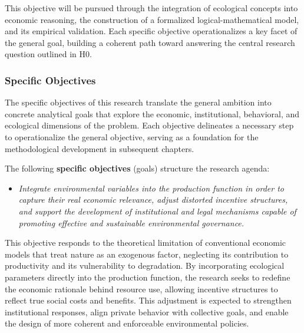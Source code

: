 This objective will be pursued through the integration of ecological concepts into economic reasoning, the construction of a formalized logical-mathematical model, and its empirical validation. Each specific objective operationalizes a key facet of the general goal, building a coherent path toward answering the central research question outlined in H0.

\subsubsection{Specific Objectives}

The specific objectives of this research translate the general ambition into concrete analytical goals that explore the economic, institutional, behavioral, and ecological dimensions of the problem. Each objective delineates a necessary step to operationalize the general objective, serving as a foundation for the methodological development in subsequent chapters.

\vspace{1em}

The following \textbf{specific objectives} (goals) structure the research agenda:

\begin{itemize}

    \item[\textbf{G1.}]
    
    \textit{Integrate environmental variables into the production function in order to capture their real economic relevance, adjust distorted incentive structures, and support the development of institutional and legal mechanisms capable of promoting effective and sustainable environmental governance.}
    
\end{itemize}

This objective responds to the theoretical limitation of conventional economic models that treat nature as an exogenous factor, neglecting its contribution to productivity and its vulnerability to degradation. By incorporating ecological parameters directly into the production function, the research seeks to redefine the economic rationale behind resource use, allowing incentive structures to reflect true social costs and benefits. This adjustment is expected to strengthen institutional responses, align private behavior with collective goals, and enable the design of more coherent and enforceable environmental policies.

